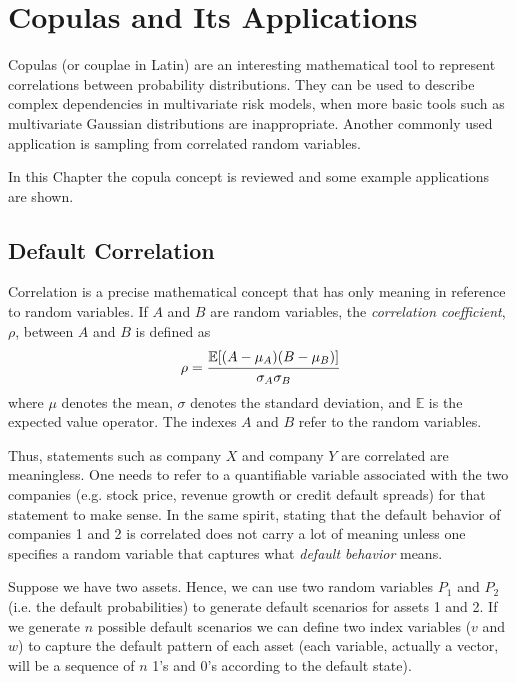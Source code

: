 \chapter{Copulas and Its Applications}

Copulas (or couplae in Latin) are an interesting mathematical tool to represent correlations between probability distributions. They can be used to describe complex dependencies in multivariate risk models, when more basic tools such as multivariate Gaussian distributions are inappropriate. Another commonly used application is sampling from correlated random variables.

In this Chapter the copula concept is reviewed and some example applications are shown. 

\section{Default Correlation}\label{sec:default_correlation}
Correlation is a precise mathematical concept that has only meaning 
in reference to random variables. If $A$ and $B$ are random variables, the \emph{correlation coefficient}, $\rho$, between $A$ and $B$ is defined as
\begin{equation}
\rho = \cfrac{\mathbb{E}[(A-\mu_A)(B-\mu_B)]}{\sigma_A \sigma_B}
\label{eq:correlation_coefficient}
\end{equation}
where $\mu$ denotes the mean, $\sigma$ denotes the standard deviation, and $\mathbb{E}$ is the expected value operator. The indexes $A$ and $B$ refer to the random variables.

Thus, statements such as company $X$ and company $Y$ are correlated are
meaningless. One needs to refer to a quantifiable variable associated with the two companies (e.g. stock price, revenue growth or credit default spreads) for that statement to make sense.
In the same spirit, stating that the default behavior of companies 1 and 2 is
correlated does not carry a lot of meaning unless one specifies a random
variable that captures what \emph{default behavior} means. %

Suppose we have two assets. Hence, we can use two random variables $P_1$ and $P_2$ (i.e. the default probabilities) to generate default scenarios for assets 1 and 2. If we generate $n$ possible default scenarios we can define two index variables ($v$ and $w$) to capture the default pattern of each asset (each variable, actually a vector, will be a sequence of $n$ 1’s and 0’s according to the default state).

